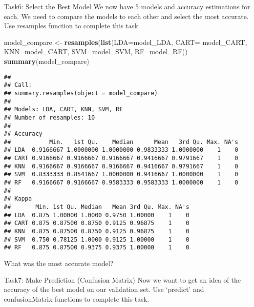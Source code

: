 \documentclass[
]{article}
\newenvironment{Shaded}{\begin{snugshade}}{\end{snugshade}}
\newcommand{\AttributeTok}[1]{\textcolor[rgb]{0.13,0.29,0.53}{#1}}
\newcommand{\CommentTok}[1]{\textcolor[rgb]{0.56,0.35,0.01}{\textit{#1}}}
\newcommand{\FunctionTok}[1]{\textcolor[rgb]{0.13,0.29,0.53}{\textbf{#1}}}
\newcommand{\NormalTok}[1]{#1}
\newcommand{\OtherTok}[1]{\textcolor[rgb]{0.56,0.35,0.01}{#1}}
\newcommand{\SpecialCharTok}[1]{\textcolor[rgb]{0.81,0.36,0.00}{\textbf{#1}}}
\begin{document}
Task6: Select the Best Model We now have 5 models and accuracy
estimations for each. We need to compare the models to each other and
select the most accurate. Use resamples function to complete this task

\begin{Shaded}
\begin{Highlighting}[]
\NormalTok{model\_compare }\OtherTok{\textless{}{-}} \FunctionTok{resamples}\NormalTok{(}\FunctionTok{list}\NormalTok{(}\AttributeTok{LDA=}\NormalTok{model\_LDA, }\AttributeTok{CART=}\NormalTok{ model\_CART, }\AttributeTok{KNN=}\NormalTok{model\_CART, }\AttributeTok{SVM=}\NormalTok{model\_SVM, }\AttributeTok{RF=}\NormalTok{model\_RF))}
\FunctionTok{summary}\NormalTok{(model\_compare)}
\end{Highlighting}
\end{Shaded}

\begin{verbatim}
## 
## Call:
## summary.resamples(object = model_compare)
## 
## Models: LDA, CART, KNN, SVM, RF 
## Number of resamples: 10 
## 
## Accuracy 
##           Min.   1st Qu.    Median      Mean   3rd Qu. Max. NA's
## LDA  0.9166667 1.0000000 1.0000000 0.9833333 1.0000000    1    0
## CART 0.9166667 0.9166667 0.9166667 0.9416667 0.9791667    1    0
## KNN  0.9166667 0.9166667 0.9166667 0.9416667 0.9791667    1    0
## SVM  0.8333333 0.8541667 1.0000000 0.9416667 1.0000000    1    0
## RF   0.9166667 0.9166667 0.9583333 0.9583333 1.0000000    1    0
## 
## Kappa 
##       Min. 1st Qu. Median   Mean 3rd Qu. Max. NA's
## LDA  0.875 1.00000 1.0000 0.9750 1.00000    1    0
## CART 0.875 0.87500 0.8750 0.9125 0.96875    1    0
## KNN  0.875 0.87500 0.8750 0.9125 0.96875    1    0
## SVM  0.750 0.78125 1.0000 0.9125 1.00000    1    0
## RF   0.875 0.87500 0.9375 0.9375 1.00000    1    0
\end{verbatim}

What was the most accurate model?

Task7: Make Prediction (Confusion Matrix) Now we want to get an idea of
the accuracy of the best model on our validation set. Use `predict' and
confusionMatrix functions to complete this task.

\begin{Shaded}
\end{Shaded}
\end{document}
